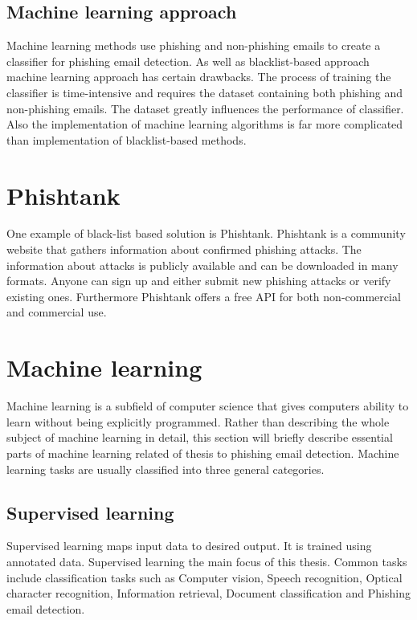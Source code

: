\documentclass[thesis=B,english]{FITthesis}[2012/10/20]
\begin{document}
\subsection{Machine learning approach}
Machine learning methods use phishing and non-phishing emails to create a classifier for phishing email detection. As well as blacklist-based approach machine learning approach has certain drawbacks. The process of training the classifier is time-intensive and requires the dataset containing both phishing and non-phishing emails. The dataset greatly influences the performance of classifier. Also the implementation of machine learning algorithms is far more complicated than implementation of blacklist-based methods.  

\section{Phishtank}
One example of black-list based solution is Phishtank. Phishtank is a community website that gathers information about confirmed phishing attacks. The information about attacks is publicly available and can be downloaded in many formats. Anyone can sign up and either submit new phishing attacks or verify existing ones. Furthermore Phishtank offers a free API for both non-commercial and commercial use. \cite{phishtank}

\section{Machine learning}
Machine learning is a subfield of computer science that gives computers ability to learn without being explicitly programmed. \cite{friedberg1958learning} Rather than describing the whole subject of machine learning in detail, this section will briefly describe essential parts of machine learning related of thesis to phishing email detection. Machine learning tasks are usually classified into three general categories.

\subsection{Supervised learning}
\par Supervised learning maps input data to desired output. It is trained using annotated data. Supervised learning the main focus of this thesis. Common tasks include classification tasks such as Computer vision, Speech recognition, Optical character recognition, Information retrieval, Document classification and Phishing email detection.
\end{document}
